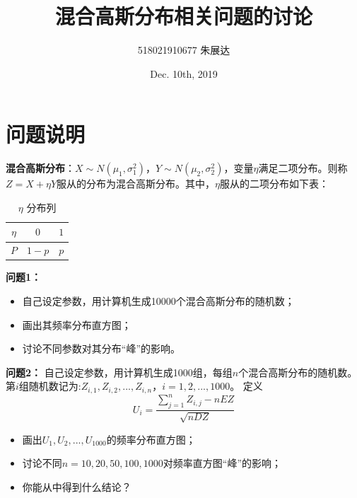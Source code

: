 \documentclass[CJK]{ctexart}
\begin{document}
\title{\textbf{混合高斯分布相关问题的讨论}}
\author{518021910677 朱展达}
\date{Dec. 10th, 2019}
\maketitle

\section{问题说明}

\textbf{混合高斯分布}：$X\sim N(\mu_1, \sigma_1^2)$，$Y\sim N(\mu_2,\sigma_2^2)$，变量$\eta$满足二项分布。则称$Z=X+\eta Y$服从的分布为混合高斯分布。其中，$\eta$服从的二项分布如下表：
    \begin{table}[h]
        \caption{$\eta$ 分布列}
        \begin{center}
        \begin{tabular}{|c|c|c|}
        \hline
        $ \eta $ & $ 0 $     & $ 1 $ \\
        \hline
        $ P $    & $ 1 - p $ & $ p $ \\
        \hline
        \end{tabular}
        \end{center}
    \end{table}

    \textbf{问题1：}
    \begin{itemize}
        \item 自己设定参数，用计算机生成10000个混合高斯分布的随机数；
        \item 画出其频率分布直方图；
        \item 讨论不同参数对其分布“峰”的影响。
    \end{itemize}

    \textbf{问题2：}
    自己设定参数，用计算机生成1000组，每组$n$个混合高斯分布的随机数。第$i$组随机数记为:$Z_{i,1},Z_{i,2}, ... ,Z_{i,n}$，$i = 1, 2, ..., 1000$。
    定义
    \begin{equation}
        U_i = \frac{\sum_{j=1}^n{Z_{i, j}} - nEZ}{\sqrt{nDZ}}
        \label{equation1}
    \end{equation}
    \begin{itemize}
        \item 画出$U_1,U_2,...,U_{1000}$的频率分布直方图；
        \item 讨论不同$n=10,20,50,100,1000$对频率直方图“峰”的影响；
        \item 你能从中得到什么结论？
    \end{itemize}
\end{document}
